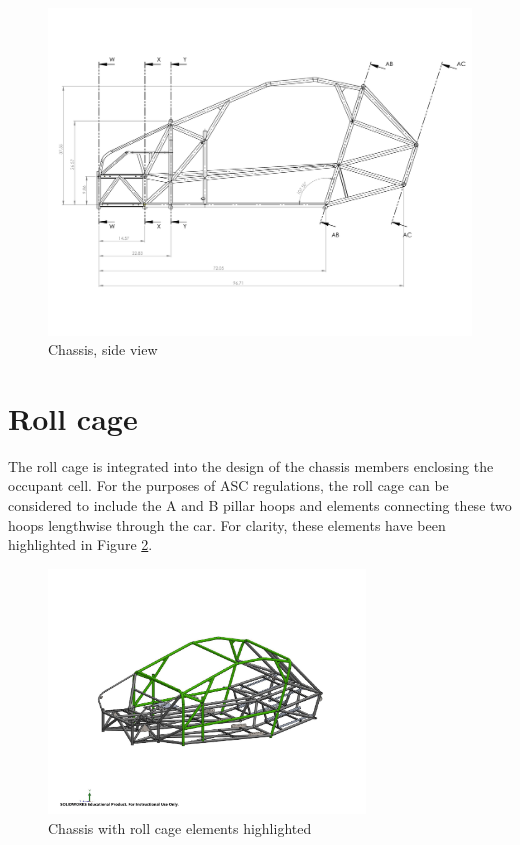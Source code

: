 \documentclass[10pt]{article}
\begin{document}
\begin{figure}[H]
\centering
\includegraphics[width=\textwidth]{figures/chassis-side}
\caption{Chassis, side view}
\label{fig:chassis-side}
\end{figure}

\section{Roll cage}
The roll cage is integrated into the design of the chassis members enclosing the occupant cell. For the purposes of ASC regulations, the roll cage can be considered to include the A and B pillar hoops and elements connecting these two hoops lengthwise through the car. For clarity, these elements have been highlighted in Figure \ref{fig:roll-cage}.

\begin{figure}[H]
\centering
\includegraphics[width=0.75\textwidth]{figures/roll-cage}
\caption{Chassis with roll cage elements highlighted}
\label{fig:roll-cage}
\end{figure}
\end{document}
